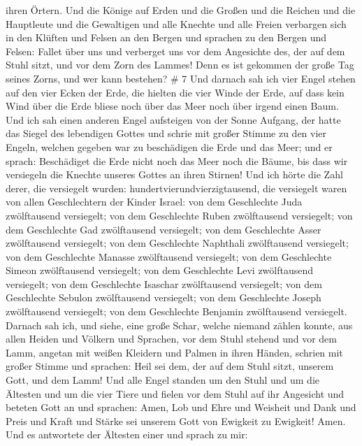 ihren Örtern.  Und die Könige auf Erden und die Großen und
die Reichen und die Hauptleute und die Gewaltigen und alle Knechte und
alle Freien verbargen sich in den Klüften und Felsen an den Bergen
 und sprachen zu den Bergen und Felsen: Fallet über uns und
verberget uns vor dem Angesichte des, der auf dem Stuhl sitzt, und vor
dem Zorn des Lammes!  Denn es ist gekommen der große Tag
seines Zorns, und wer kann bestehen? \# 7  Und darnach sah
ich vier Engel stehen auf den vier Ecken der Erde, die hielten die vier
Winde der Erde, auf dass kein Wind über die Erde bliese noch über das
Meer noch über irgend einen Baum.  Und ich sah einen anderen
Engel aufsteigen von der Sonne Aufgang, der hatte das Siegel des
lebendigen Gottes und schrie mit großer Stimme zu den vier Engeln,
welchen gegeben war zu beschädigen die Erde und das Meer; 
und er sprach: Beschädiget die Erde nicht noch das Meer noch die Bäume,
bis dass wir versiegeln die Knechte unseres Gottes an ihren Stirnen!
 Und ich hörte die Zahl derer, die versiegelt wurden:
hundertvierundvierzigtausend, die versiegelt waren von allen
Geschlechtern der Kinder Israel:  von dem Geschlechte Juda
zwölftausend versiegelt; von dem Geschlechte Ruben zwölftausend
versiegelt; von dem Geschlechte Gad zwölftausend versiegelt;
 von dem Geschlechte Asser zwölftausend versiegelt; von dem
Geschlechte Naphthali zwölftausend versiegelt; von dem Geschlechte
Manasse zwölftausend versiegelt;  von dem Geschlechte Simeon
zwölftausend versiegelt; von dem Geschlechte Levi zwölftausend
versiegelt; von dem Geschlechte Isaschar zwölftausend versiegelt;
 von dem Geschlechte Sebulon zwölftausend versiegelt; von
dem Geschlechte Joseph zwölftausend versiegelt; von dem Geschlechte
Benjamin zwölftausend versiegelt.  Darnach sah ich, und
siehe, eine große Schar, welche niemand zählen konnte, aus allen Heiden
und Völkern und Sprachen, vor dem Stuhl stehend und vor dem Lamm,
angetan mit weißen Kleidern und Palmen in ihren Händen, 
schrien mit großer Stimme und sprachen: Heil sei dem, der auf dem Stuhl
sitzt, unserem Gott, und dem Lamm!  Und alle Engel standen
um den Stuhl und um die Ältesten und um die vier Tiere und fielen vor
dem Stuhl auf ihr Angesicht und beteten Gott an  und
sprachen: Amen, Lob und Ehre und Weisheit und Dank und Preis und Kraft
und Stärke sei unserem Gott von Ewigkeit zu Ewigkeit! Amen.
 Und es antwortete der Ältesten einer und sprach zu mir:
